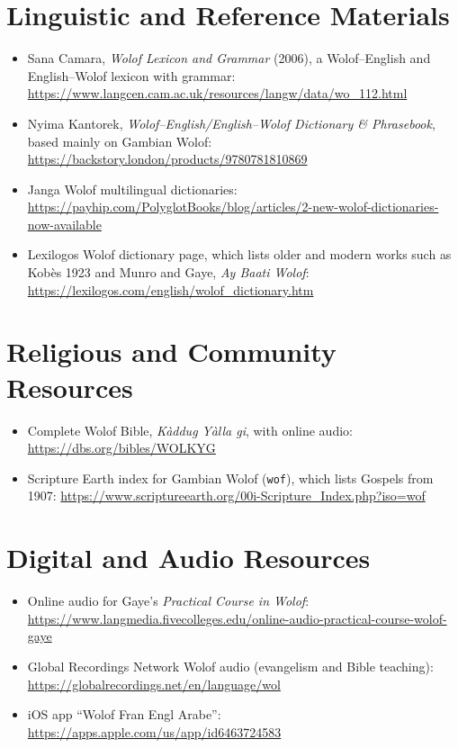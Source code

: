 \documentclass[12pt]{article}
\begin{document}
\section{Linguistic and Reference Materials}
\begin{itemize}
\item Sana Camara, \emph{Wolof Lexicon and Grammar} (2006), a Wolof--English and English--Wolof lexicon with grammar: \url{https://www.langcen.cam.ac.uk/resources/langw/data/wo_112.html}
\item Nyima Kantorek, \emph{Wolof--English/English--Wolof Dictionary \& Phrasebook}, based mainly on Gambian Wolof: \url{https://backstory.london/products/9780781810869}
\item Janga Wolof multilingual dictionaries: \url{https://payhip.com/PolyglotBooks/blog/articles/2-new-wolof-dictionaries-now-available}
\item Lexilogos Wolof dictionary page, which lists older and modern works such as Kob\`es 1923 and Munro and Gaye, \emph{Ay Baati Wolof}: \url{https://lexilogos.com/english/wolof_dictionary.htm}
\end{itemize}

\section{Religious and Community Resources}
\begin{itemize}
\item Complete Wolof Bible, \emph{K\`addug Y\`alla gi}, with online audio: \url{https://dbs.org/bibles/WOLKYG}
\item Scripture Earth index for Gambian Wolof (\texttt{wof}), which lists Gospels from 1907: \url{https://www.scriptureearth.org/00i-Scripture_Index.php?iso=wof}
\end{itemize}

\section{Digital and Audio Resources}
\begin{itemize}
\item Online audio for Gaye's \emph{Practical Course in Wolof}: \url{https://www.langmedia.fivecolleges.edu/online-audio-practical-course-wolof-gaye}
\item Global Recordings Network Wolof audio (evangelism and Bible teaching): \url{https://globalrecordings.net/en/language/wol}
\item iOS app ``Wolof Fran Engl Arabe'': \url{https://apps.apple.com/us/app/id6463724583}
\end{itemize}
\end{document}
